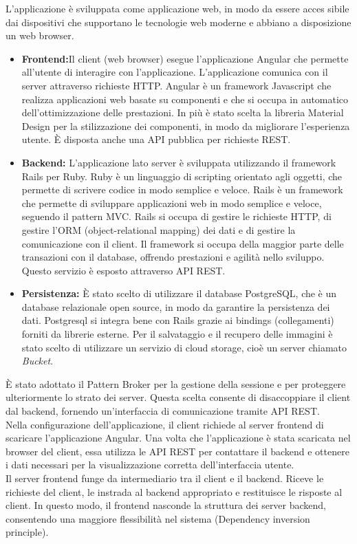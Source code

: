 L’applicazione è sviluppata come applicazione web, in modo da essere acces sibile dai dispositivi che supportano le tecnologie web moderne e abbiano a disposizione un web browser.
\begin{itemize}
	\item \large{\textbf{Frontend:}}\newline Il client (web browser) esegue l'applicazione Angular che permette all'utente di interagire con l'applicazione. L'applicazione comunica con il server attraverso richieste HTTP. Angular è un framework Javascript che realizza applicazioni web basate su componenti e che si occupa in automatico dell'ottimizzazione delle prestazioni. In più è stato scelta la libreria Material Design per la stilizzazione dei componenti, in modo da migliorare l'esperienza utente. È disposta anche una API pubblica per richieste REST. 
	\item \large{\textbf{Backend:}}\newline
	L'applicazione lato server è sviluppata utilizzando il framework Rails per Ruby. Ruby è un linguaggio di scripting orientato agli oggetti, che permette di scrivere codice in modo semplice e veloce. Rails è un framework che permette di sviluppare applicazioni web in modo semplice e veloce, seguendo il pattern MVC. Rails si occupa di gestire le richieste HTTP, di gestire l'ORM (object-relational mapping) dei dati e di gestire la comunicazione con il client. Il framework si occupa della maggior parte delle transazioni con il database, offrendo prestazioni e agilità nello sviluppo. Questo servizio è esposto attraverso API REST.
	\item \large{\textbf{Persistenza:}}\newline
	È stato scelto di utilizzare il database PostgreSQL, che è un database relazionale open source, in modo da garantire la persistenza dei dati. Postgresql si integra bene con Rails grazie ai bindings (collegamenti) forniti da librerie esterne.
	Per il salvataggio e il recupero delle immagini è stato scelto di utilizzare un servizio di cloud storage, cioè un server chiamato \textit{Bucket}.
\end{itemize}

È stato adottato il Pattern Broker per la gestione della sessione e per proteggere ulteriormente lo strato dei server. Questa scelta consente di disaccoppiare il client dal backend, fornendo un'interfaccia di comunicazione tramite API REST.\\

Nella configurazione dell'applicazione, il client richiede al server frontend di scaricare l'applicazione Angular. Una volta che l'applicazione è stata scaricata nel browser del client, essa utilizza le API REST per contattare il backend e ottenere i dati necessari per la visualizzazione corretta dell'interfaccia utente.\\

Il server frontend funge da intermediario tra il client e il backend. Riceve le richieste del client, le instrada al backend appropriato e restituisce le risposte al client. In questo modo, il frontend nasconde la struttura dei server backend, consentendo una maggiore flessibilità nel sistema (Dependency inversion principle).\\